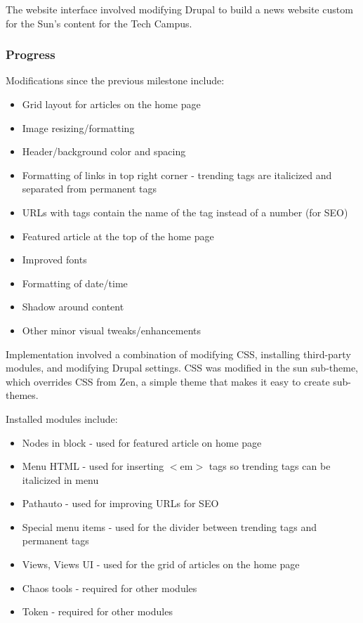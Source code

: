 \documentclass[12pt]{article} %
\begin{document}
The website interface involved modifying Drupal to build a news website custom for the Sun’s content for the Tech Campus.

\subsubsection{Progress}

Modifications since the previous milestone include:

\begin{itemize}
\item Grid layout for articles on the home page
\item Image resizing/formatting
\item Header/background color and spacing
\item Formatting of links in top right corner - trending tags are italicized and separated from permanent tags
\item URLs with tags contain the name of the tag instead of a number (for SEO)
\item Featured article at the top of the home page
\item Improved fonts
\item Formatting of date/time
\item Shadow around content
\item Other minor visual tweaks/enhancements
\end{itemize}

Implementation involved a combination of modifying CSS, installing third-party modules, and modifying Drupal settings. CSS was modified in the sun sub-theme, which overrides CSS from Zen, a simple theme that makes it easy to create sub-themes.

Installed modules include:

\begin{itemize}
\item Nodes in block - used for featured article on home page
\item Menu HTML - used for inserting $<$em$>$ tags so trending tags can be italicized in menu
\item Pathauto - used for improving URLs for SEO
\item Special menu items - used for the divider between trending tags and permanent tags
\item Views, Views UI - used for the grid of articles on the home page
\item Chaos tools - required for other modules
\item Token - required for other modules
\end{itemize}
\end{document}
